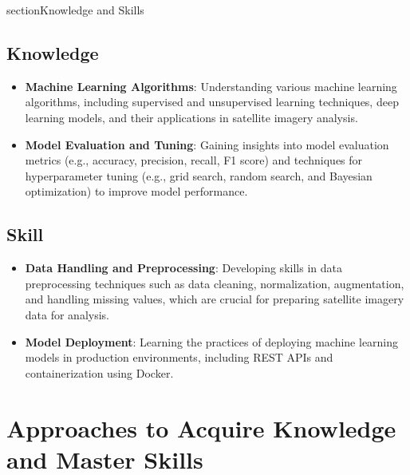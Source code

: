 \documentclass[12pt]{article}
\begin{document}
section{Knowledge and Skills}

\subsection{Knowledge}
\begin{itemize}
    \item \textbf{Machine Learning Algorithms}: Understanding various machine learning algorithms, including supervised and unsupervised learning techniques, deep learning models, and their applications in satellite imagery analysis.
    \item \textbf{Model Evaluation and Tuning}: Gaining insights into model evaluation metrics (e.g., accuracy, precision, recall, F1 score) and techniques for hyperparameter tuning (e.g., grid search, random search, and Bayesian optimization) to improve model performance.
\end{itemize}

\subsection{Skill}
\begin{itemize}
    \item \textbf{Data Handling and Preprocessing}: Developing skills in data preprocessing techniques such as data cleaning, normalization, augmentation, and handling missing values, which are crucial for preparing satellite imagery data for analysis.
    \item \textbf{Model Deployment}: Learning the practices of deploying machine learning models in production environments, including REST APIs and containerization using Docker.
\end{itemize}

\section{Approaches to Acquire Knowledge and Master Skills}
\end{document}
